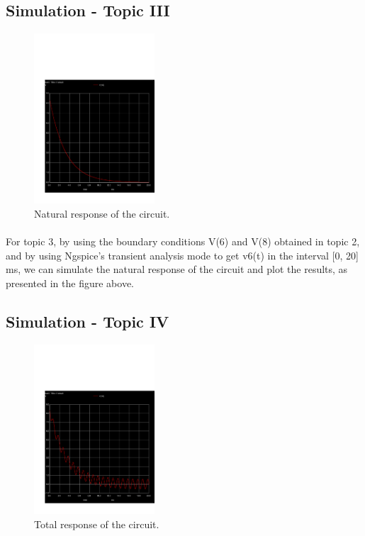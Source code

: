 \subsection{Simulation - Topic III}
\label{subsec:sim_third}

\begin{figure}[H] \centering
\includegraphics[width=0.4\textwidth]{trans1.pdf}
\caption{Natural response of the circuit.}
\label{fig:natural}
\end{figure}

\paragraph{}
For topic 3, by using the boundary conditions V(6) and V(8) obtained in topic 2, and by using Ngspice’s transient analysis mode to get v6(t) in the interval [0, 20] ms, we can simulate the natural response of the circuit and plot the results, as presented in the figure above.


\subsection{Simulation - Topic IV}
\label{subsec:sim_fourth}

\begin{figure}[H] \centering
\includegraphics[width=0.4\textwidth]{trans2.pdf}
\caption{Total response of the circuit.}
\label{fig:total}
\end{figure}

